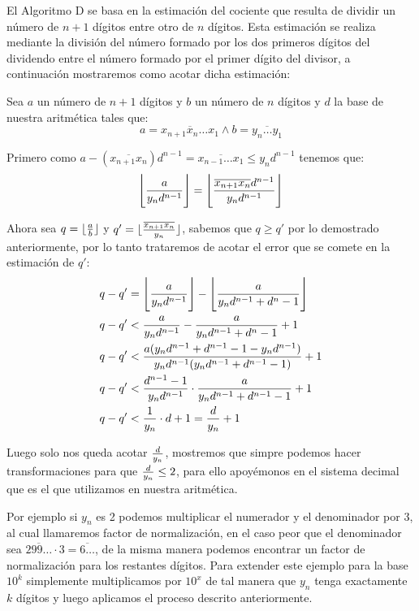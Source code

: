 \documentclass[a4paper,10pt,twocolumn]{article}
\begin{document}
	El Algoritmo D se basa en la estimación del cociente que resulta de dividir un número de $n+1$ dígitos entre otro de $n$ dígitos. Esta estimación se realiza mediante la división del número formado por los dos primeros dígitos del dividendo entre el número formado por el primer dígito del divisor, a continuación mostraremos como acotar dicha estimación:
	
	Sea $a$ un número de $n+1$ dígitos y $b$ un número de $n$ dígitos y $d$ la base de nuestra aritmética tales que:
		$$a=\overline{x_{n+1}x_n\ldots x_1} \wedge b=\overline{y_n\ldots y_1}$$	 
	
	Primero como $a-(\overline{x_{n+1}x_n}) d^{n-1}= \overline{x_{n-1}\ldots x_1}\leq y_n d^{n-1}$ tenemos que:
	\begin{equation}
		\Bigg\lfloor{a \over y_nd^{n-1}}\Bigg\rfloor = \Bigg\lfloor{\overline{x_{n+1}x_n} d^{n-1} \over y_n d^{n-1}}\Bigg\rfloor
	\end{equation}
	
	Ahora sea $q=\lfloor{a \over b}\rfloor$ y $q'=\lfloor{\overline{x_{n+1}x_n} \over y_n}\rfloor$, sabemos que $q\geq q'$ por lo demostrado anteriormente, por lo tanto trataremos de acotar el error que se comete en la estimación de $q'$:
	\begin{equation}
		\begin{split}
			&q-q'=\Bigg\lfloor{a \over y_n d^{n-1}}\Bigg\rfloor-\Bigg\lfloor{a \over y_n d^{n-1}+d^n-1}\Bigg\rfloor\\ 
			&q-q'<{a \over y_n d^{n-1}}-{a \over y_n d^{n-1}+d^n-1}+1\\
			&q-q'<{a(y_n d^{n-1}+d^{n-1}-1-y_n d^{n-1})\over y_n d^{n-1}(y_n d^{n-1}+d^{n-1}-1)}+1\\
			&q-q'<{d^{n-1}-1\over y_n d^{n-1}}\cdot {a
\over y_n d^{n-1}+d^{n-1}-1}+1\\
			&q-q'<{1\over y_n}\cdot d+1={d\over y_n}+1
		\end{split}
	\end{equation}
	
	Luego solo nos queda acotar ${d\over y_n}$, mostremos que simpre podemos hacer transformaciones para que ${d\over y_n}\leq 2$, para ello apoyémonos en el sistema decimal que es el que utilizamos en nuestra aritmética. 
	
	Por ejemplo si $y_n$ es 2 podemos multiplicar el numerador y el denominador por 3, al cual llamaremos factor de normalización, en el caso peor que el denominador sea $\overline{299\ldots} \cdot 3= \overline{6\ldots }$, de la misma manera podemos encontrar un factor de normalización para los restantes dígitos. Para extender este ejemplo para la base $10^k$ simplemente multiplicamos por $10^x$ de tal manera que $y_n$ tenga exactamente $k$ dígitos y luego aplicamos el proceso descrito anteriormente.
	
\end{document}

